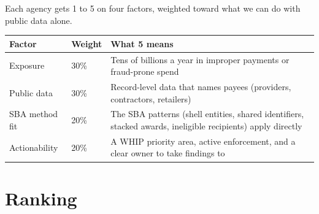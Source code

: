 \documentclass[letterpaper,11pt]{article}
\begin{document}
Each agency gets 1 to 5 on four factors, weighted toward what we can do
with public data alone.

\begingroup\small\setlength{\tabcolsep}{4pt}\renewcommand{\arraystretch}{1.25}
\begin{longtable}[l]{@{}>{\raggedright\arraybackslash}p{}l>{\raggedright\arraybackslash}p{}@{}}
\rowcolor{coolblack}\leavevmode\color{white}\bfseries Factor & \leavevmode\color{white}\bfseries Weight & \leavevmode\color{white}\bfseries What 5 means \\
\endhead
Exposure & 30\% & Tens of billions a year in improper payments or fraud-prone spend \\
Public data & 30\% & Record-level data that names payees (providers, contractors, retailers) \\
SBA method fit & 20\% & The SBA patterns (shell entities, shared identifiers, stacked awards, ineligible recipients) apply directly \\
Actionability & 20\% & A WHIP priority area, active enforcement, and a clear owner to take findings to \\
\end{longtable}\endgroup

\hypertarget{ranking}{%
\section{Ranking}\label{ranking}}
\end{document}

